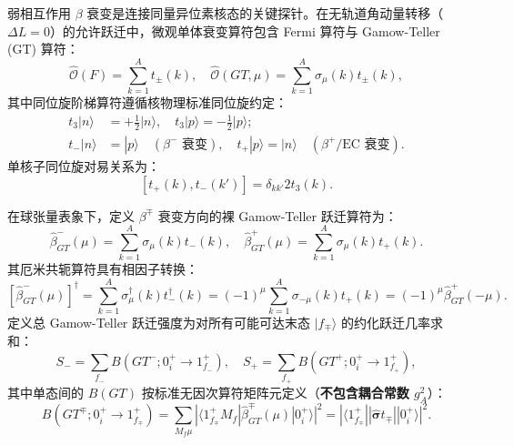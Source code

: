弱相互作用 $\beta$ 衰变是连接同量异位素核态的关键探针。在无轨道角动量转移（$\Delta L = 0$）的允许跃迁中，微观单体衰变算符包含 Fermi 算符与 Gamow-Teller (GT) 算符：
\begin{equation}\label{eq:2-7-weak-operators}
\hat{\mathcal{O}}(F) = \sum_{k=1}^A t_\pm(k), \quad \hat{\mathcal{O}}(GT, \mu) = \sum_{k=1}^A \sigma_\mu(k) t_\pm(k),
\end{equation}
其中同位旋阶梯算符遵循核物理标准同位旋约定：
\begin{equation}\label{eq:2-7-isospin-ladder-convention}
\begin{aligned}
t_3 |n\rangle &= +\frac{1}{2} |n\rangle, \quad t_3 |p\rangle = -\frac{1}{2} |p\rangle; \\
t_- |n\rangle &= |p\rangle \quad (\beta^-\text{ 衰变}), \quad t_+ |p\rangle = |n\rangle \quad (\beta^+\text{/EC 衰变}).
\end{aligned}
\end{equation}
单核子同位旋对易关系为：
\begin{equation}\label{eq:2-7-isospin-commutator}
[t_+(k), t_-(k')] = \delta_{kk'} 2 t_3(k).
\end{equation}

在球张量表象下，定义 $\beta^\mp$ 衰变方向的裸 Gamow-Teller 跃迁算符为：
\begin{equation}\label{eq:2-7-beta-GT-pm}
\hat{\beta}^-_{GT}(\mu) = \sum_{k=1}^A \sigma_\mu(k) t_-(k), \quad \hat{\beta}^+_{GT}(\mu) = \sum_{k=1}^A \sigma_\mu(k) t_+(k).
\end{equation}
其厄米共轭算符具有相因子转换：
\begin{equation}\label{eq:2-7-hermitian-conjugate}
[\hat{\beta}^-_{GT}(\mu)]^\dagger = \sum_{k=1}^A \sigma_\mu^\dagger(k) t_-^\dagger(k) = (-1)^\mu \sum_{k=1}^A \sigma_{-\mu}(k) t_+(k) = (-1)^\mu \hat{\beta}^+_{GT}(-\mu).
\end{equation}
定义总 Gamow-Teller 跃迁强度为对所有可能可达末态 $|f_\mp\rangle$ 的约化跃迁几率求和：
\begin{equation}\label{eq:2-7-sum-definitions}
S_- = \sum_{f_-} B(GT^-; 0^+_i \to 1^+_{f_-}), \quad S_+ = \sum_{f_+} B(GT^+; 0^+_i \to 1^+_{f_+}),
\end{equation}
其中单态间的 $B(GT)$ 按标准无因次算符矩阵元定义（\textbf{不包含耦合常数 $g_A^2$}）：
\begin{equation}\label{eq:2-7-BGT-bare-def}
B(GT^\mp; 0^+_i \to 1^+_{f_\mp}) = \sum_{M_f \mu} |\langle 1^+_{f_\mp} M_f | \hat{\beta}^\mp_{GT}(\mu) | 0^+_i \rangle|^2 = |\langle 1^+_{f_\mp} || \hat{\boldsymbol{\sigma}} t_\mp || 0^+_i \rangle|^2.
\end{equation}


